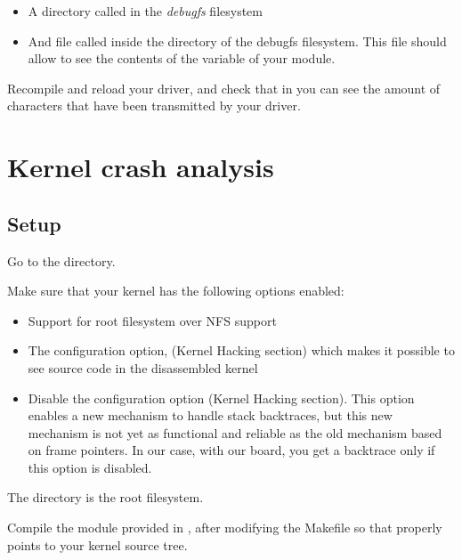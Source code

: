 \begin{itemize}

\item A directory called  in the {\em debugfs} filesystem

\item And file called  inside the 
  directory of the debugfs filesystem. This file should allow to see
  the contents of the  variable of your module.

\end{itemize}

Recompile and reload your driver, and check that in
 you can see the amount of characters
that have been transmitted by your driver.

\section{Kernel crash analysis}

\subsection{Setup}

Go to the  directory.

Make sure that your kernel has the following options enabled:

\begin{itemize}

\item Support for root filesystem over NFS support

\item The  configuration option, (Kernel
  Hacking section) which makes it possible to see source code in the
  disassembled kernel

\item Disable the  configuration option
  (Kernel Hacking section). This option enables a new mechanism to
  handle stack backtraces, but this new mechanism is not yet as
  functional and reliable as the old mechanism based on frame
  pointers. In our case, with our board, you get a backtrace only if
  this option is disabled.

\end{itemize}

The  directory is the root filesystem.

Compile the  module provided
  in , after modifying the Makefile so
  that  properly points to your kernel source tree.

